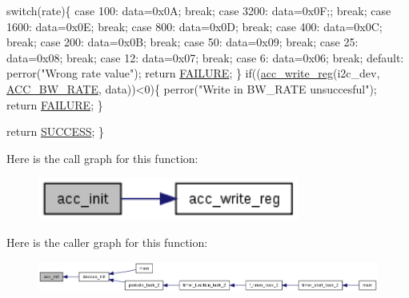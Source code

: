 \begin{DoxyCode}
  \textcolor{keywordflow}{switch}(rate)\{
    \textcolor{keywordflow}{case} 100:
      data=0x0A;
      \textcolor{keywordflow}{break};
    \textcolor{keywordflow}{case} 3200:
      data=0x0F;;
      \textcolor{keywordflow}{break};
    \textcolor{keywordflow}{case} 1600:
      data=0x0E;
      \textcolor{keywordflow}{break};
    \textcolor{keywordflow}{case} 800:
      data=0x0D;
      \textcolor{keywordflow}{break};
    \textcolor{keywordflow}{case} 400:
      data=0x0C;
      \textcolor{keywordflow}{break};
    \textcolor{keywordflow}{case} 200:
      data=0x0B;
      \textcolor{keywordflow}{break};
    \textcolor{keywordflow}{case} 50:
      data=0x09;
      \textcolor{keywordflow}{break}; 
    \textcolor{keywordflow}{case} 25:
      data=0x08;
      \textcolor{keywordflow}{break};
    \textcolor{keywordflow}{case} 12:
      data=0x07;
      \textcolor{keywordflow}{break};
    \textcolor{keywordflow}{case} 6:
      data=0x06;
      \textcolor{keywordflow}{break};
    \textcolor{keywordflow}{default}:
      perror(\textcolor{stringliteral}{"Wrong rate value"});
      \textcolor{keywordflow}{return} \hyperlink{calibration_2calibration_8h_a6d58f9ac447476b4e084d7ca383f5183}{FAILURE};
  \}
  \textcolor{keywordflow}{if}((\hyperlink{group__acc_ga534116416343122de29a5b6ade6876bd}{acc\_write\_reg}(i2c\_dev, \hyperlink{imu__regs_8h_afbbb5a3aa097a32f98c47158141a882f}{ACC\_BW\_RATE}, data))<0)\{
    perror(\textcolor{stringliteral}{"Write in BW\_RATE unsuccesful"});
    \textcolor{keywordflow}{return} \hyperlink{calibration_2calibration_8h_a6d58f9ac447476b4e084d7ca383f5183}{FAILURE};
  \}
  
  \textcolor{keywordflow}{return} \hyperlink{calibration_2calibration_8h_aa90cac659d18e8ef6294c7ae337f6b58}{SUCCESS};
\}
\end{DoxyCode}


Here is the call graph for this function\-:
\nopagebreak
\begin{figure}[H]
\begin{center}
\leavevmode
\includegraphics[width=244pt]{group__acc_gae8f9cc6e0d15e61039d846305f86f073_cgraph}
\end{center}
\end{figure}




Here is the caller graph for this function\-:
\nopagebreak
\begin{figure}[H]
\begin{center}
\leavevmode
\includegraphics[width=350pt]{group__acc_gae8f9cc6e0d15e61039d846305f86f073_icgraph}
\end{center}
\end{figure}


